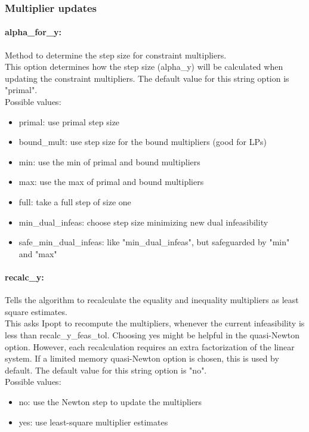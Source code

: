 \subsubsection{Multiplier updates}

\paragraph{alpha\_for\_y:} Method to determine the step size for constraint multipliers. $\;$ \\
 This option determines how the step size
(alpha\_y) will be calculated when updating the
constraint multipliers.
The default value for this string option is "primal".
\\ 
Possible values:
\begin{itemize}
   \item primal: use primal step size
   \item bound\_mult: use step size for the bound multipliers (good
for LPs)
   \item min: use the min of primal and bound multipliers
   \item max: use the max of primal and bound multipliers
   \item full: take a full step of size one
   \item min\_dual\_infeas: choose step size minimizing new dual
infeasibility
   \item safe\_min\_dual\_infeas: like "min\_dual\_infeas", but safeguarded by
"min" and "max"
\end{itemize}

\paragraph{recalc\_y:} Tells the algorithm to recalculate the equality and inequality multipliers as least square estimates. $\;$ \\
 This asks Ipopt to recompute the
multipliers, whenever the current infeasibility
is less than recalc\_y\_feas\_tol. Choosing yes
might be helpful in the quasi-Newton option. 
However, each recalculation requires an extra
factorization of the linear system.  If a limited
memory quasi-Newton option is chosen, this is
used by default.
The default value for this string option is "no".
\\ 
Possible values:
\begin{itemize}
   \item no: use the Newton step to update the multipliers
   \item yes: use least-square multiplier estimates
\end{itemize}

